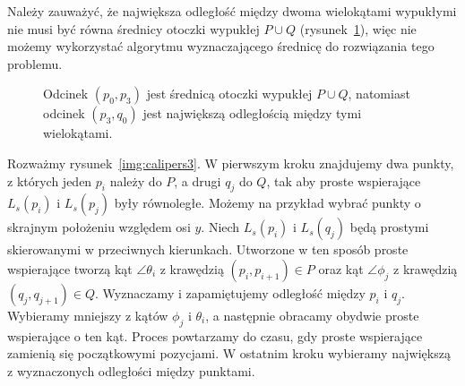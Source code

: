 Należy zauważyć, że największa odległość między dwoma wielokątami
wypukłymi nie musi być równa średnicy otoczki wypukłej $P \cup Q$
(rysunek~\ref{fig:maxdist}), więc nie możemy wykorzystać algorytmu
wyznaczającego średnicę do rozwiązania tego problemu.

\begin{figure}[tb]
  \centering
  \caption{\label{fig:maxdist} Odcinek $(p_0, p_3)$ jest średnicą otoczki
    wypukłej $P \cup Q$, natomiast odcinek $(p_3, q_0)$ jest największą
    odległością między tymi wielokątami.}
\end{figure}

Rozważmy rysunek~\ref{img:calipers3}. W pierwszym kroku znajdujemy dwa
punkty, z których jeden $p_i$ należy do $P$, a drugi $q_j$ do $Q$, tak
aby proste wspierające $L_s(p_i)$ i $L_s(p_j)$ były równoległe. Możemy
na przykład wybrać punkty o skrajnym położeniu względem osi $y$. Niech
$L_s(p_i)$ i $L_s(q_j)$ będą prostymi skierowanymi w przeciwnych
kierunkach. Utworzone w ten sposób proste wspierające tworzą kąt
$\angle{\theta_i}$ z krawędzią $(p_i, p_{i+1}) \in P$ oraz kąt
$\angle{\phi_j}$ z krawędzią $(q_j, q_{j+1}) \in Q$. Wyznaczamy i
zapamiętujemy odległość między $p_i$ i $q_j$. Wybieramy mniejszy z
kątów $\phi_j$ i $\theta_i$, a następnie obracamy obydwie proste
wspierające o ten kąt. Proces powtarzamy do czasu, gdy proste
wspierające zamienią się początkowymi pozycjami. W ostatnim kroku
wybieramy największą z wyznaczonych odległości między punktami.

